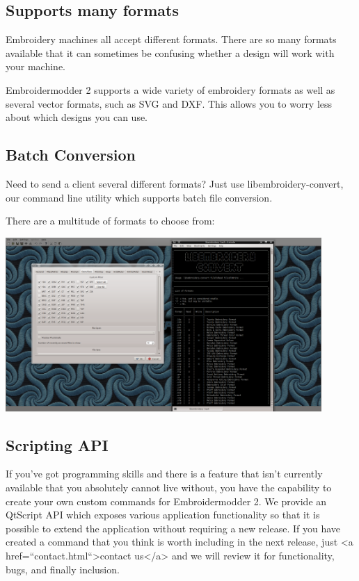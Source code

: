 \documentclass[a4paper, 11pt]{report}
\begin{document}
\subsection{Supports many formats}

Embroidery machines all accept different formats. There are so many formats available that it can sometimes be confusing whether a design will work with your machine.

Embroidermodder 2 supports a wide variety of embroidery formats as well as several vector formats, such as SVG and DXF. This allows you to worry less about which designs you can use.

\subsection{Batch Conversion}

Need to send a client several different formats? Just use libembroidery-convert, our command line utility which supports batch file conversion.

There are a multitude of formats to choose from:

\includegraphics[width=0.9\textwidth]{images/features-formats-1.png}

\subsection{Scripting API}

If you've got programming skills and there is a feature that isn't currently available that you absolutely cannot live without, you have the capability to create your own custom commands for Embroidermodder 2. We provide an QtScript API which exposes various application functionality so that it is possible to extend the application without requiring a new release. If you have created a command that you think is worth including in the next release, just <a href=``contact.html``>contact us</a> and we will review it for functionality, bugs, and finally inclusion.
\end{document}
